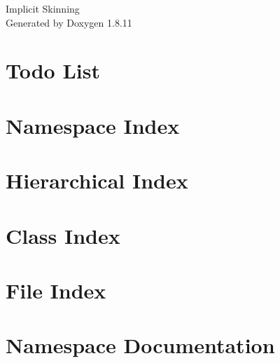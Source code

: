 \documentclass[twoside]{book}
\newcommand{\+}{\discretionary{\mbox{\scriptsize$\hookleftarrow$}}{}{}}
\newcommand{\clearemptydoublepage}{%
  \newpage{\pagestyle{empty}\cleardoublepage}%
}
\begin{document}
\hypersetup{pageanchor=false,
             bookmarksnumbered=true,
             pdfencoding=unicode
            }
\begin{titlepage}
\vspace*{7cm}
\begin{center}%
{\Large Implicit Skinning }\\
\vspace*{1cm}
{\large Generated by Doxygen 1.8.11}\\
\end{center}
\end{titlepage}
\clearemptydoublepage
\tableofcontents
\clearemptydoublepage
{}
\hypersetup{pageanchor=true}

\chapter{Todo List}
\label{todo}
\hypertarget{todo}{}

\chapter{Namespace Index}

\chapter{Hierarchical Index}

\chapter{Class Index}

\chapter{File Index}

\chapter{Namespace Documentation}





\end{document}
